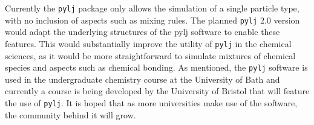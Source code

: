 Currently the \texttt{pylj} package only allows the simulation of a single particle type, with no inclusion of aspects such as mixing rules.
The planned \texttt{pylj} 2.0 version would adapt the underlying structures of the pylj software to enable these features.
This would substantially improve the utility of \texttt{pylj} in the chemical sciences, as it would be more straightforward to simulate mixtures of chemical species and aspects such as chemical bonding.
As mentioned, the \texttt{pylj} software is used in the undergraduate chemistry course at the University of Bath and currently a course is being developed by the University of Bristol that will feature the use of \texttt{pylj}.
It is hoped that as more universities make use of the software, the community behind it will grow.

